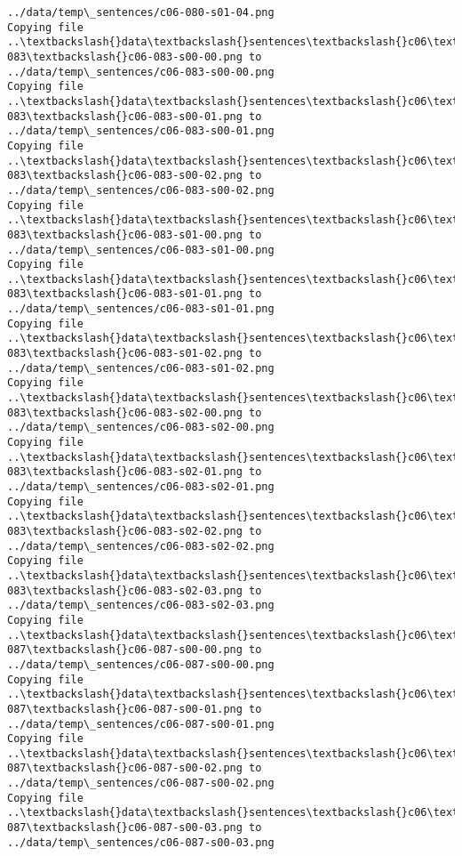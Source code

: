 \documentclass[11pt]{article}
\begin{document}
\begin{Verbatim}[commandchars=\\\{\}]
../data/temp\_sentences/c06-080-s01-04.png
Copying file ..\textbackslash{}data\textbackslash{}sentences\textbackslash{}c06\textbackslash{}c06-083\textbackslash{}c06-083-s00-00.png to
../data/temp\_sentences/c06-083-s00-00.png
Copying file ..\textbackslash{}data\textbackslash{}sentences\textbackslash{}c06\textbackslash{}c06-083\textbackslash{}c06-083-s00-01.png to
../data/temp\_sentences/c06-083-s00-01.png
Copying file ..\textbackslash{}data\textbackslash{}sentences\textbackslash{}c06\textbackslash{}c06-083\textbackslash{}c06-083-s00-02.png to
../data/temp\_sentences/c06-083-s00-02.png
Copying file ..\textbackslash{}data\textbackslash{}sentences\textbackslash{}c06\textbackslash{}c06-083\textbackslash{}c06-083-s01-00.png to
../data/temp\_sentences/c06-083-s01-00.png
Copying file ..\textbackslash{}data\textbackslash{}sentences\textbackslash{}c06\textbackslash{}c06-083\textbackslash{}c06-083-s01-01.png to
../data/temp\_sentences/c06-083-s01-01.png
Copying file ..\textbackslash{}data\textbackslash{}sentences\textbackslash{}c06\textbackslash{}c06-083\textbackslash{}c06-083-s01-02.png to
../data/temp\_sentences/c06-083-s01-02.png
Copying file ..\textbackslash{}data\textbackslash{}sentences\textbackslash{}c06\textbackslash{}c06-083\textbackslash{}c06-083-s02-00.png to
../data/temp\_sentences/c06-083-s02-00.png
Copying file ..\textbackslash{}data\textbackslash{}sentences\textbackslash{}c06\textbackslash{}c06-083\textbackslash{}c06-083-s02-01.png to
../data/temp\_sentences/c06-083-s02-01.png
Copying file ..\textbackslash{}data\textbackslash{}sentences\textbackslash{}c06\textbackslash{}c06-083\textbackslash{}c06-083-s02-02.png to
../data/temp\_sentences/c06-083-s02-02.png
Copying file ..\textbackslash{}data\textbackslash{}sentences\textbackslash{}c06\textbackslash{}c06-083\textbackslash{}c06-083-s02-03.png to
../data/temp\_sentences/c06-083-s02-03.png
Copying file ..\textbackslash{}data\textbackslash{}sentences\textbackslash{}c06\textbackslash{}c06-087\textbackslash{}c06-087-s00-00.png to
../data/temp\_sentences/c06-087-s00-00.png
Copying file ..\textbackslash{}data\textbackslash{}sentences\textbackslash{}c06\textbackslash{}c06-087\textbackslash{}c06-087-s00-01.png to
../data/temp\_sentences/c06-087-s00-01.png
Copying file ..\textbackslash{}data\textbackslash{}sentences\textbackslash{}c06\textbackslash{}c06-087\textbackslash{}c06-087-s00-02.png to
../data/temp\_sentences/c06-087-s00-02.png
Copying file ..\textbackslash{}data\textbackslash{}sentences\textbackslash{}c06\textbackslash{}c06-087\textbackslash{}c06-087-s00-03.png to
../data/temp\_sentences/c06-087-s00-03.png

\end{Verbatim}
\end{document}
